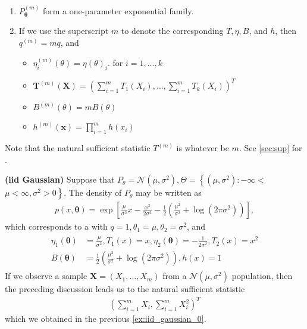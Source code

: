 \documentclass{article}
\newcommand{\bfs}[1]{\textbf{({#1}) }}
\begin{document}
\begin{enumerate}
    \item $P_{\boldsymbol{\theta}}^{(m)}$ form a one-parameter exponential family.
    \item If we use the superscript $m$ to denote the corresponding $T, \eta, B$, and $h$, then $q^{(m)}=m q$, and
    \begin{itemize}
        \item $\eta^{(m)}_i(\theta) =\eta(\theta)_i$. for $i=1,...,k$
        \item $\mathbf{T}^{(m)}(\mathbf{X})=\left(\sum_{i=1}^{m} T_{1}\left(X_{i}\right), \ldots, \sum_{i=1}^{m} T_{k}\left(X_{i}\right)\right)^{T}$
        \item $B^{(m)}(\theta)=m B(\theta)$
        \item $h^{(m)}(\mathbf{x})=\prod_{i=1}^{m} h\left(x_{i}\right)$
    \end{itemize}
\end{enumerate}
Note that the natural sufficient statistic $T^{(m)}$ is  whatever be $m$.  See \cref{sec:sup} for .
\begin{exma}\bfs{\gls{iid} Gaussian}\label{ex:iid_gaussian_1}
Suppose that $P_{\theta}=\mathcal{N}\left(\mu, \sigma^{2}\right), \Theta=\left\{\left(\mu, \sigma^{2}\right):-\infty<\right.$ $\left.\mu<\infty, \sigma^{2}>0\right\}$. The density of $P_{\theta}$ may be written as
\begin{align*}
p(x, \boldsymbol{\theta})=\exp \left[\frac{\mu}{\sigma^{2}} x-\frac{x^{2}}{2 \sigma^{2}}-\frac{1}{2}\left(\frac{\mu^{2}}{\sigma^{2}}+\log \left(2 \pi \sigma^{2}\right)\right)\right],
\end{align*}
which corresponds to a  with $q=1, \theta_{1}=\mu, \theta_{2}=\sigma^{2}$, and
\begin{align*}
\begin{aligned}
\eta_{1}(\boldsymbol{\theta}) &=\frac{\mu}{\sigma^{2}}, T_{1}(x)=x, \eta_{2}(\boldsymbol{\theta})=-\frac{1}{2 \sigma^{2}}, T_{2}(x)=x^{2} \\
B(\boldsymbol{\theta}) &=\frac{1}{2}\left(\frac{\mu^{2}}{\sigma^{2}}+\log \left(2 \pi \sigma^{2}\right)\right), h(x)=1
\end{aligned}
\end{align*}
If we observe a sample $\mathbf{X}=\left(X_{1}, \ldots, X_{m}\right)$ from a $\mathcal{N}\left(\mu, \sigma^{2}\right)$ population, then the preceding discussion leads us to the natural sufficient statistic
\begin{align*}
\left(\sum_{i=1}^{m} X_{i}, \sum_{i=1}^{m} X_{i}^{2}\right)^{T}
\end{align*}
which we obtained in the previous \cref{ex:iid_gaussian_0}.
\end{exma} 
\end{document}
